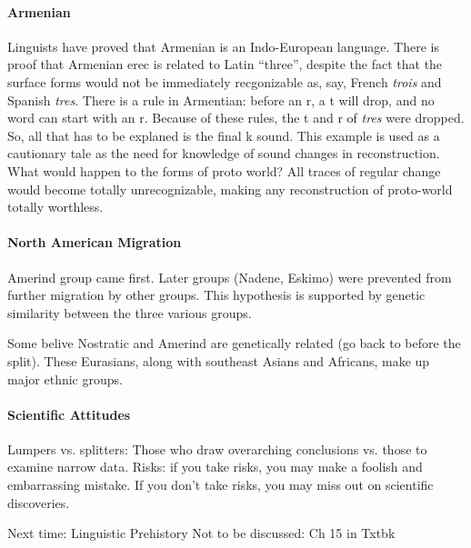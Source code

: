 \documentclass{exam}
\begin{document}
\paragraph{Armenian}Linguists have proved that Armenian is an Indo-European language. 
There is proof that Armenian erec is related to Latin ``three'', despite the fact that the surface forms would not be immediately recgonizable as, say, French \textit{trois} and Spanish \textit{tres}. 
There is a rule in Armentian: before an r, a t will drop, and no word can start with an r. 
Because of these rules, the t and r of \textit{tres} were dropped. 
So, all that has to be explaned is the final k sound. 
This example is used as a cautionary tale as the need for knowledge of sound changes in reconstruction. 
What would happen to the forms of proto world? 
All traces of regular change would become totally unrecognizable, making any reconstruction of proto-world totally worthless. 

\paragraph{North American Migration}

Amerind group came first. 
Later groups (Nadene, Eskimo) were prevented from further migration by other groups. 
This hypothesis is supported by genetic similarity between the three various groups. 

Some belive Nostratic and Amerind are genetically related (go back to before the split).
These Eurasians, along with southeast Asians and Africans, make up major ethnic groups. 
\paragraph{Scientific Attitudes}Lumpers vs. splitters: Those who draw overarching conclusions vs. those to examine narrow data.  
Risks: if you take risks, you may make a foolish and embarrassing mistake. 
If you don't take risks, you may miss out on scientific discoveries. 

Next time: Linguistic Prehistory
Not to be discussed: Ch 15 in Txtbk
\end{document}
